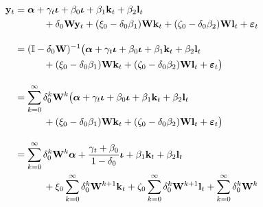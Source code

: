 \begin{align}
    \label{eq:static-vector-reduced}
    \mathbf y_t &= \boldsymbol \alpha
                    + \gamma_t \boldsymbol \iota
                    + \beta_0 \boldsymbol \iota
                    + \beta_1 \mathbf k_{t}
                    + \beta_2 \mathbf l_{t}
                    \\ & \qquad\quad \notag
                    + \delta_0 \mathbf W \mathbf y_t
                    + (\xi_0-\delta_0\beta_1) \mathbf W \mathbf k_t
                    + (\zeta_0-\delta_0\beta_2) \mathbf W \mathbf l_t 
                    + \boldsymbol \varepsilon_{t}
    \\[1em] \notag
            &= (\mathbb I - \delta_0 \mathbf W)^{-1} \big(
                    \boldsymbol \alpha
                    + \gamma_t \boldsymbol \iota
                    + \beta_0 \boldsymbol \iota
                    + \beta_1 \mathbf k_{t}
                    + \beta_2 \mathbf l_{t}
                    \\ & \qquad\quad \notag
                    + (\xi_0-\delta_0\beta_1) \mathbf W \mathbf k_t
                    + (\zeta_0-\delta_0\beta_2) \mathbf W \mathbf l_t 
                    + \boldsymbol \varepsilon_{t}
                \big)
    \\[1em]
            &= \sum_{k=0}^\infty \delta_0^k \mathbf W^k \big(
                    \boldsymbol \alpha
                    + \gamma_t \boldsymbol \iota
                    + \beta_0 \boldsymbol \iota
                    + \beta_1 \mathbf k_{t}
                    + \beta_2 \mathbf l_{t}
                    \\ & \qquad\quad \notag
                    + (\xi_0-\delta_0\beta_1) \mathbf W \mathbf k_t
                    + (\zeta_0-\delta_0\beta_2) \mathbf W \mathbf l_t 
                    + \boldsymbol \varepsilon_{t}
                \big)
    \\[1em]
    \label{eq:static-reflection-problem}
            &=   \sum_{k=0}^\infty \delta_0^k \mathbf W^k
                        \boldsymbol \alpha
                    +\frac{\gamma_t + \beta_0}{1-\delta_0}\boldsymbol \iota
                    + \beta_1 \mathbf k_{t}
                    + \beta_2 \mathbf l_{t}
                    \\ & \qquad\quad \notag
                    + \xi_0\sum_{k=0}^\infty \delta_0^k \mathbf W^{k+1} \mathbf k_t
                    + \zeta_0\sum_{k=0}^\infty \delta_0^k \mathbf W^{k+1} \mathbf l_t                    
                    + \sum_{k=0}^\infty \delta_0^k \mathbf W^k

\end{align}
